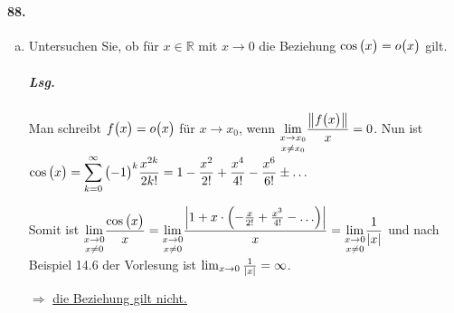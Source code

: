 \documentclass{scrreprt}
\begin{document}
\paragraph{88.}
\begin{enumerate}[(a)]
\item Untersuchen Sie, ob für $x \in \mathbb{R}$ mit $x \to 0$ die Beziehung
  $\cos\qty\big(x) = o\qty\big(x)$ gilt.
  \subparagraph{Lsg.} Man schreibt $f\qty\big(x) = o\qty\big(x)$ für $x \to x_0$,
  wenn $\displaystyle \underset{x \ne x_0}{\lim_{x \to x_0}}
  \frac{\norm{f\qty\big(x)}}{x} = 0$.
  Nun ist $\displaystyle \cos\qty\big(x) =
  \sum_{k = 0}^{\infty} \qty\big(-1)^k \frac{x^{2k}}{2k!} =
  1 - \frac{x^2}{2!} + \frac{x^4}{4!} - \frac{x^6}{6!} \pm \ldots$

  Somit ist $\displaystyle \underset{x \ne 0}{\lim_{x \to 0}}
  \frac{\cos\qty\big(x)}{x} = \underset{x \ne 0}{\lim_{x \to 0}}
  \frac{\abs{1 + x \cdot \qty(-\frac{x}{2!} + \frac{x^3}{4!} - \ldots)}}{x}
  = \underset{x \ne 0}{\lim_{x \to 0}} \frac{1}{\abs{x}}$
  und nach Beispiel 14.6 der Vorlesung ist
  $\lim_{x \to 0} \frac{1}{\abs{x}} = \infty$.

  $\Rightarrow$ \underline{die Beziehung gilt nicht.}
\end{enumerate}
\end{document}

